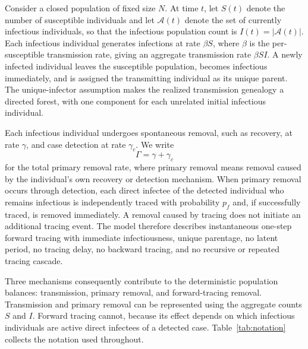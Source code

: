 \documentclass[review,12pt]{elsarticle}
\numberwithin{equation}{section}
\theoremstyle{remark}
\begin{document}
Consider a closed population of fixed size $N$. At time $t$, let $S(t)$ denote the number of susceptible individuals and let $\mathcal A(t)$ denote the set of currently infectious individuals, so that the infectious population count is $I(t)=|\mathcal A(t)|$. Each infectious individual generates infections at rate $\beta S$, where $\beta$ is the per-susceptible transmission rate, giving an aggregate transmission rate $\beta S I$. A newly infected individual leaves the susceptible population, becomes infectious immediately, and is assigned the transmitting individual as its unique parent. The unique-infector assumption makes the realized transmission genealogy a directed forest, with one component for each unrelated initial infectious individual.

Each infectious individual undergoes spontaneous removal, such as recovery, at rate $\gamma$, and case detection at rate $\gamma_c$. We write
\begin{equation}
\Gamma = \gamma + \gamma_c
\label{eq:2.2}
\end{equation}
for the total primary removal rate, where primary removal means removal caused by the individual's own recovery or detection mechanism. When primary removal occurs through detection, each direct infectee of the detected individual who remains infectious is independently traced with probability $p_f$ and, if successfully traced, is removed immediately. A removal caused by tracing does not initiate an additional tracing event. The model therefore describes instantaneous one-step forward tracing with immediate infectiousness, unique parentage, no latent period, no tracing delay, no backward tracing, and no recursive or repeated tracing cascade.

Three mechanisms consequently contribute to the deterministic population balances: transmission, primary removal, and forward-tracing removal. Transmission and primary removal can be represented using the aggregate counts $S$ and $I$. Forward tracing cannot, because its effect depends on which infectious individuals are active direct infectees of a detected case. Table~\ref{tab:notation} collects the notation used throughout.
\end{document}
